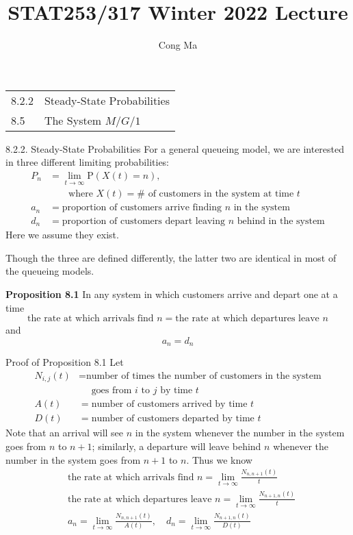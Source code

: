 \documentclass[letterpaper]{beamer}
\title{STAT253/317 Winter 2022 Lecture \chapnum} \date{} \author{Cong Ma}
\def\p{\mathrm P}
\begin{document}
\begin{frame}\maketitle
\bigskip

\begin{center}\large
\begin{tabular}{ll}
8.2.2 & Steady-State Probabilities\\
8.5 & The System $M/G/1$
\end{tabular}
\end{center}
\end{frame}
\begin{frame}{8.2.2. Steady-State Probabilities}
For a general queueing model, we are interested in three different limiting probabilities:
\begin{align*}
P_n &=\lim_{t\to\infty}\p(X(t)=n),\\[-3pt]
    &\qquad\mbox{where $X(t)=\#$ of customers in the system at time $t$}\\
a_n &=\mbox{proportion of customers arrive finding $n$ in the system}\\
d_n &=\mbox{proportion of customers depart leaving $n$ behind in the system}
\end{align*}
Here we assume they exist.

Though the three are defined differently, the latter two are identical in most of the queueing models.\bigskip

\textbf{Proposition 8.1} In any system in which customers arrive and depart one at a time
$$
\mbox{the rate at which arrivals find }n = \mbox{the rate at which departures leave }n
$$
and
$$a_n = d_n$$
\end{frame}
\begin{frame}{Proof of Proposition 8.1}
Let
\begin{align*}
N_{i,j}(t)&=\mbox{number of times the number of customers in the system}\\
&\quad\mbox{ goes from $i$ to $j$ by time }t\\
A(t)&=\mbox{number of customers arrived by time }t\\
D(t)&=\mbox{number of customers departed by time }t
\end{align*}
Note that an arrival will see $n$ in the system whenever the number in the system
goes from $n$ to $n + 1$; similarly, a departure will leave behind $n$ whenever the
number in the system goes from $n + 1$ to $n$.
Thus we know
\begin{align*}
&\mbox{the rate at which arrivals find }n = \lim_{t\to\infty}\frac{N_{n,n+1}(t)}{t}\\
&\mbox{the rate at which departures leave }n = \lim_{t\to\infty}\frac{N_{n+1,n}(t)}{t}\\
&a_n=\lim_{t\to\infty}\frac{N_{n,n+1}(t)}{A(t)},\quad d_n=\lim_{t\to\infty}\frac{N_{n+1,n}(t)}{D(t)}
\end{align*}
\end{frame}
\end{document}
